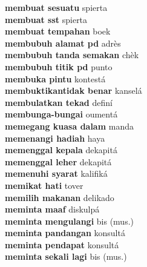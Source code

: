 \textbf{ membuat sesuatu  } spierta \\
\textbf{ membuat sst  } spierta \\
\textbf{ membuat tempahan  } boek \\
\textbf{ membubuh alamat pd  } adrès \\
\textbf{ membubuh tanda semakan  } chèk \\
\textbf{ membubuh titik pd  } punto \\
\textbf{ membuka pintu  } kontestá \\
\textbf{ membuktikantidak benar  } kanselá \\
\textbf{ membulatkan tekad  } definí \\
\textbf{ membunga-bungai  } oumentá \\
\textbf{ memegang kuasa dalam  } manda \\
\textbf{ memenangi hadiah  } haya \\
\textbf{ memenggal kepala  } dekapitá \\
\textbf{ memenggal leher  } dekapitá \\
\textbf{ memenuhi syarat  } kalifiká \\
\textbf{ memikat hati  } tover \\
\textbf{ memilih makanan  } delikado \\
\textbf{ meminta maaf  } diskulpá \\
\textbf{ meminta mengulangi  } bis (mus.) \\
\textbf{ meminta pandangan  } konsultá \\
\textbf{ meminta pendapat  } konsultá \\
\textbf{ meminta sekali lagi  } bis (mus.) \\
